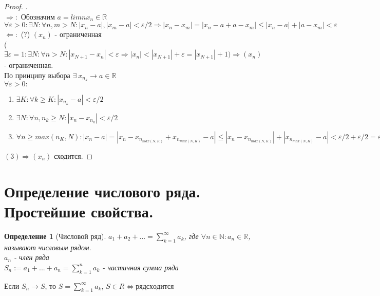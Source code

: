 \documentclass[12pt, a4]{article}
\newtheorem*{definition}{Определение}
\renewcommand{\implies}{\Rightarrow}
\newcommand{\bimplies}{\Leftarrow}
\renewcommand{\iff}{\Leftrightarrow}
\renewcommand{\epsilon}{\varepsilon}
\newcommand{\R}{\mathbb{R}}
\newcommand{\N}{\mathbb{N}}
\begin{document}
\begin{proof}.\\
$\implies:$ Обозначим $a = limn x_n \in \R$\\
$\forall \epsilon > 0: \exists N: \forall n, m > N: |x_n - a|, |x_m - a| < \epsilon/2 \implies |x_n-x_m|=|x_n-a+a-x_m|\leq|x_n-a|+|a-x_m| < \epsilon$\\
$\bimplies:$ (?) $(x_n)$ - ограниченная\\
($\exists \epsilon = 1: \exists N: \forall n > N: |x_{N+1} - x_n| < \epsilon \implies |x_n| < |x_{N+1}| + \epsilon = |x_{N+1}| + 1) \implies (x_n)$ - ограниченная.\\
По принципу выбора $\exists\ x_{n_k} \to a \in \R$\\
$\forall \epsilon > 0:$
\begin{enumerate}
    \item $\exists K: \forall k \geq K: |x_{n_k}-a| < \epsilon/2$
    \item $\exists N: \forall n, n_k \geq N: |x_n - x_{n_k}| < \epsilon/2$
    \item $\forall n \geq max(n_K, N): |x_n - a| = |x_n - x_{n_{max(N, K)}} + x_{n_{max(N, K)}} - a| \leq |x_n - x_{n_{max(N, K)}}| + |x_{n_{max(N, K)}} - a| < \epsilon/2 + \epsilon/2 = \epsilon$
\end{enumerate}
$(3) \implies (x_n)$ сходится.
\end{proof}

\section{Определение числового ряда. Простейшие свойства.}

\begin{definition}[Числовой ряд]
$a_1 + a_2 + ... = \sum_{k=1}^\infty a_k$, где $\forall n \in \N: a_n \in \R$, называют числовым рядом.\\
$a_n$ - член ряда\\
$S_n := a_1 + ... + a_n = \sum_{k=1}^n a_k$ - частичная сумма ряда
\end{definition}

Если $S_n \to S$, то $S = \sum_{k=1}^\infty a_k$, $S \in R \iff ряд сходится$\\
\end{document}
